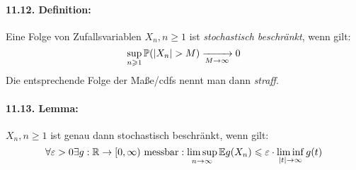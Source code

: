 \documentclass[11pt]{report}
\begin{document}
\paragraph{11.12. Definition:} Eine Folge von Zufallsvariablen $X_n,n\geq 1$ ist \textit{stochastisch beschr\"ankt}, wenn gilt:
$$\sup_{n\geq1}\Pp(|X_n|> M)\nto{}{M\to\infty}0$$
Die entsprechende Folge der Ma\ss{}e/cdfs nennt man dann \textit{straff}.

\paragraph{11.13. Lemma:} $X_n,n\geq1$ ist genau dann stochastisch beschr\"ankt, wenn gilt:
\begin{equation}
    \forall\varepsilon>0\exists g:\mathbb{R}\to[0,\infty)\text{ messbar}:\limsup_{n\to\infty}\mathbb{E} g(X_n)\leqslant\varepsilon\cdot\liminf_{|t|\to\infty}g(t)
\end{equation}
\end{document}
